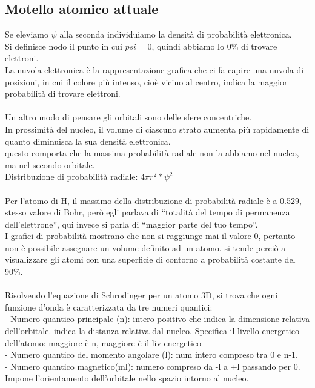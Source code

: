\subsection{Motello atomico attuale}
Se eleviamo $\psi$ alla seconda individuiamo la densità di probabilità elettronica.\\
Si definisce nodo il punto in cui $psi = 0$, quindi abbiamo lo 0\% di trovare elettroni.\\
La nuvola elettronica è la rappresentazione grafica che ci fa capire una nuvola di posizioni, in cui il colore più intenso, cioè vicino al centro, indica la maggior probabilità di trovare elettroni.\\\\
Un altro modo di pensare gli orbitali sono delle sfere concentriche.\\
In prossimità del nucleo, il volume di ciascuno strato aumenta più rapidamente di quanto diminuisca la sua densità elettronica.\\
questo comporta che la massima probabilità radiale non la abbiamo nel nucleo, ma nel secondo orbitale.\\
Distribuzione di probabilità radiale: $4\pi r^2 * \psi^2$\\\\
Per l’atomo di H, il massimo della distribuzione di probabilità radiale è a 0.529, stesso valore di Bohr, però egli parlava di “totalità del tempo di permanenza dell’elettrone”, qui invece si parla di “maggior parte del tuo tempo”.\\
I grafici di probabilità mostrano che non si raggiunge mai il valore 0, pertanto non è possibile assegnare un volume definito ad un atomo. si tende perciò a visualizzare gli atomi con una superficie di contorno a probabilità costante del 90\%.\\\\
Risolvendo l’equazione di Schrodinger per un atomo 3D, si trova che ogni funzione d’onda è caratterizzata da tre numeri quantici:\\
\tab- Numero quantico principale (n): intero positivo che indica la dimensione relativa dell’orbitale. indica la distanza relativa dal nucleo. Specifica il livello energetico dell’atomo: maggiore è n, maggiore è il liv energetico\\
\tab- Numero quantico del momento angolare (l): num intero compreso tra 0 e n-1. \\
\tab- Numero quantico magnetico(ml): numero compreso da -l a +l passando per 0. Impone l’orientamento dell’orbitale nello spazio intorno al nucleo.\\\\
